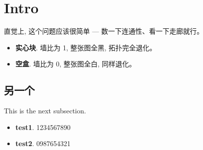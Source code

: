 \documentclass{article}
\begin{document}
\section{Intro}

直觉上, 这个问题应该很简单 --- 数一下连通性、看一下走廊就行。

\begin{itemize}[leftmargin=*, itemsep=0pt, topsep=0pt]
\item \textbf{实心块}. 墙比为 1, 整张图全黑, 拓扑完全退化。
\item \textbf{空盒}. 墙比为 0, 整张图全白, 同样退化。
\end{itemize}

\subsection{另一个}

This is the next subsection.

\begin{itemize}[leftmargin=*, itemsep=0pt, topsep=0pt]
\item \textbf{test1}. 1234567890
\item \textbf{test2}. 0987654321
\end{itemize}
\end{document}
